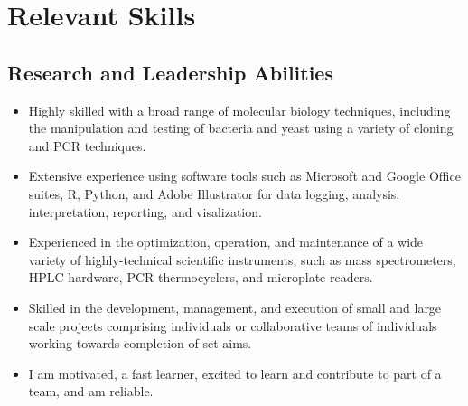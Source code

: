\documentclass[11pt]{article}
\begin{document}
\section*{Relevant Skills}
\begin{addmargin}[3em]{2em}%
	\subsection*{Research and Leadership Abilities}
	\begin{itemize}
		\item Highly skilled with a broad range of molecular biology techniques, including the manipulation and testing of bacteria and yeast using a variety of cloning and PCR techniques.
        \item Extensive experience using software tools such as Microsoft and Google Office suites, R, Python, and Adobe Illustrator for data logging, analysis, interpretation, reporting, and visalization.
        \item Experienced in the optimization, operation, and maintenance of a wide variety of highly-technical scientific instruments, such as mass spectrometers, HPLC hardware, PCR thermocyclers, and microplate readers. 
		\item Skilled in the development, management, and execution of small and large scale projects comprising individuals or collaborative teams of individuals working towards completion of set aims.
		\item I am motivated, a fast learner, excited to learn and contribute to part of a team, and am reliable.



\end{itemize}
\end{addmargin}
\end{document}
